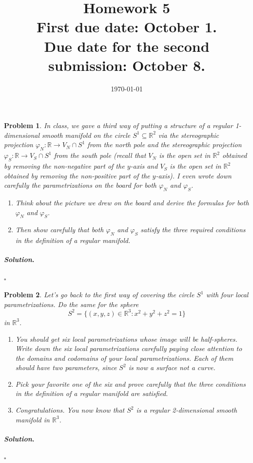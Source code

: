 \documentclass[reqno]{amsart}
\theoremstyle{plain}
\newtheorem{problem}{Problem}
\theoremstyle{definition}
\newenvironment{solution}{\paragraph{\emph{Solution}.}}{\hfill$\square$}
\begin{document}
 

\title[Homework 5]{Homework 5 \\ First due date: October 1.  \\  Due date for the second submission:  October 8.}

\date{\today} 
\maketitle 



\begin{problem}
In class, we gave a third way of putting a structure of a regular 1-dimensional smooth manifold on the circle $S^{1} \subseteq \mathbb{R}^{2}$ via the stereographic projection $\varphi_{N}: \mathbb{R} \rightarrow V_{N} \cap S^{1}$ from the north pole and the stereographic projection $\varphi_{S}: \mathbb{R} \rightarrow V_{S} \cap S^{1}$ from the south pole (recall that $V_{N}$ is the open set in $\mathbb{R}^{2}$ obtained by removing the non-negative part of the $y$-axis and $V_{S}$ is the open set in $\mathbb{R}^{2}$ obtained by removing the non-positive part of the $y$-axis).  I even wrote down carefully the parametrizations on the board for both $\varphi_{N}$ and $\varphi_{S}$.
\begin{enumerate}
\item Think about the picture we drew on the board and derive the formulas for both $\varphi_{N}$ and $\varphi_{S}$.
\item Then show carefully that both $\varphi_{N}$ and $\varphi_{S}$ satisfy the three required conditions in the definition of a regular manifold.
\end{enumerate}
\end{problem}
\begin{solution}

\end{solution}

\begin{problem}
Let's go back to the first way of covering the circle $S^{1}$ with four local parametrizations.  Do the same for the sphere
$$S^{2} = \{(x,y,z) \in \mathbb{R}^{3}: x^{2} + y^{2} + z^{2} = 1 \} $$
in $\mathbb{R}^{3}$.
\begin{enumerate}
\item You should get six local parametrizations whose image will be half-spheres.  Write down the six local parametrizations carefully paying close attention to the domains and codomains of your local parametrizations.  Each of them should have two parameters, since $S^{2}$ is now a surface not a curve.
\item Pick your favorite one of the six and prove carefully that the three conditions in the definition of a regular manifold are satisfied.
\item Congratulations.  You now know that $S^{2}$ is a regular 2-dimensional smooth manifold in $\mathbb{R}^{3}$.
\end{enumerate}
\end{problem}
\begin{solution}

\end{solution}
\end{document}
